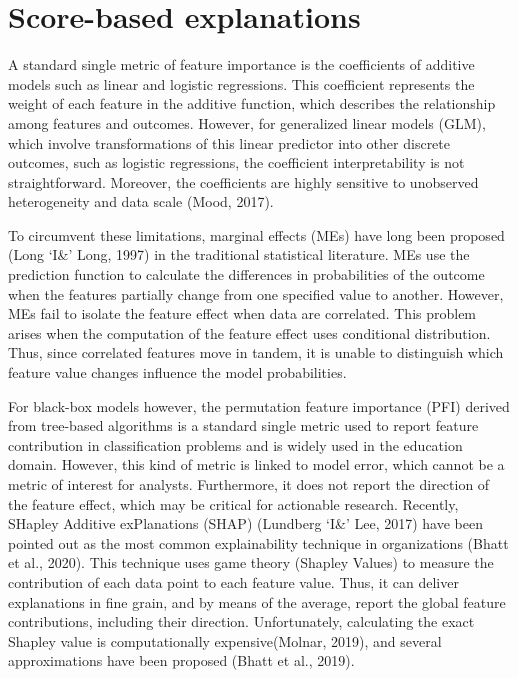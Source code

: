 \section{Score-based explanations}
\label{sec:scores}

A standard single metric of feature importance is the coefficients of additive models such as linear and logistic regressions. This coefficient represents the weight of each feature in the additive function, which describes the relationship among features and outcomes. However, for generalized linear models (GLM), which involve transformations of this linear predictor into other discrete outcomes, such as logistic regressions, the coefficient interpretability is not straightforward. Moreover, the coefficients are highly sensitive to unobserved heterogeneity and data scale (Mood, 2017). 

To circumvent these limitations, marginal effects (MEs) have long been proposed (Long `I\&' Long, 1997) in the traditional statistical literature. MEs use the prediction function to calculate the differences in probabilities of the outcome when the features partially change from one specified value to another. However, MEs fail to isolate the feature effect when data are correlated. This problem arises when the computation of the feature effect uses conditional distribution. Thus, since correlated features move in tandem, it is unable to distinguish which feature value changes influence the model probabilities.

For black-box models however, the permutation feature importance (PFI) derived from tree-based algorithms is a standard single metric used to report feature contribution in classification problems and is widely used in the education domain. However, this kind of metric is linked to model error, which cannot be a metric of interest for analysts. Furthermore, it does not report the direction of the feature effect, which may be critical for actionable research. Recently, SHapley Additive exPlanations (SHAP) (Lundberg `I\&' Lee, 2017) have been pointed out as the most common explainability technique in organizations (Bhatt et al., 2020). This technique uses game theory (Shapley Values) to measure the contribution of each data point to each feature value. Thus, it can deliver explanations in fine grain, and by means of the average, report the global feature contributions, including their direction. Unfortunately, calculating the exact Shapley value is computationally expensive(Molnar, 2019), and several approximations have been proposed (Bhatt et al., 2019). 

